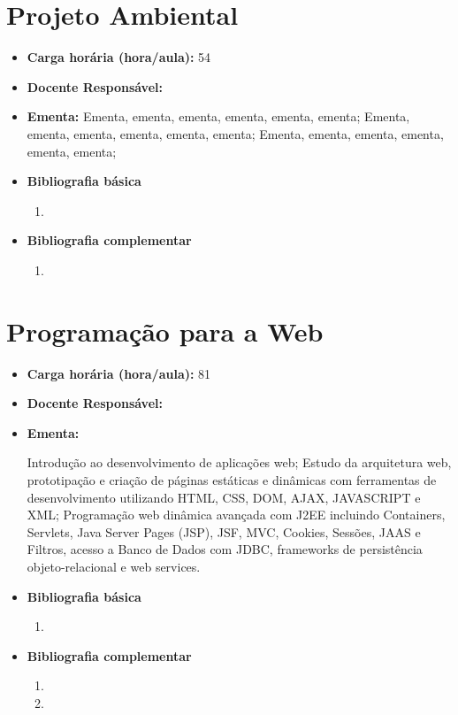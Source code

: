 \documentclass[11pt,fleqn]{book} %
\begin{document}

\newpage
\section{Projeto Ambiental}\label{disc:projamb}

\begin{itemize}
	\item \textbf{Carga horária (hora/aula):} 54
	\item \textbf{Docente Responsável:}~
	\item \textbf{Ementa:} 
	Ementa, ementa, ementa, ementa, ementa, ementa;
	Ementa, ementa, ementa, ementa, ementa, ementa;
	Ementa, ementa, ementa, ementa, ementa, ementa;	
	\item \textbf{Bibliografia básica}
	\begin{enumerate}
		\item 
	\end{enumerate}
	\item \textbf{Bibliografia complementar}
	\begin{enumerate}
		\item 	
	\end{enumerate}	
\end{itemize}


\newpage
\section{Programação para a Web}\label{disc:ppw}

\begin{itemize}
	\item \textbf{Carga horária (hora/aula):} 81
	\item \textbf{Docente Responsável:}~
	\item \textbf{Ementa:} 

	Introdução ao desenvolvimento de aplicações web;
	Estudo da arquitetura web, prototipação e criação de páginas estáticas e dinâmicas com ferramentas de desenvolvimento utilizando HTML, CSS, DOM, AJAX, JAVASCRIPT e XML;
	Programação web dinâmica avançada com J2EE incluindo Containers, Servlets, Java Server Pages (JSP), JSF, MVC, Cookies, Sessões, JAAS e Filtros, acesso a Banco de Dados com JDBC, frameworks de persistência objeto-relacional e web services.
	
	\item \textbf{Bibliografia básica}
	\begin{enumerate}
		\item 
	\end{enumerate}
	\item \textbf{Bibliografia complementar}
	\begin{enumerate}
		\item
		\item 
	\end{enumerate}
\end{itemize}
\end{document}
